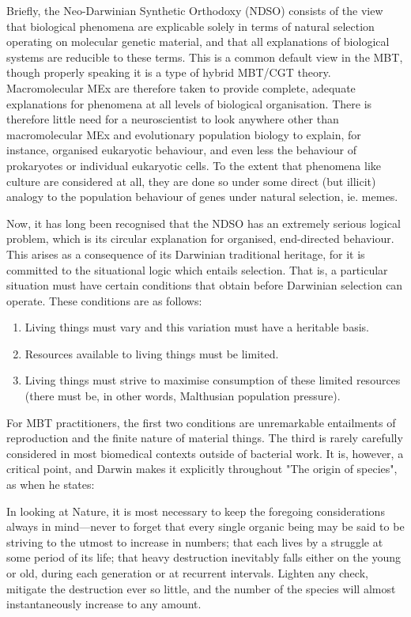 Briefly, the Neo-Darwinian Synthetic Orthodoxy (NDSO) consists of the view that biological phenomena are explicable solely in terms of natural selection operating on molecular genetic material, and that all explanations of biological systems are reducible to these terms. This is a common default view in the MBT, though properly speaking it is a type of hybrid MBT/CGT theory. Macromolecular MEx are therefore taken to provide complete, adequate explanations for phenomena at all levels of biological organisation. There is therefore little need for a neuroscientist to look anywhere other than macromolecular MEx and evolutionary population biology to explain, for instance, organised eukaryotic behaviour, and even less the behaviour of prokaryotes or individual eukaryotic cells. To the extent that phenomena like culture are considered at all, they are done so under some direct (but illicit) analogy to the population behaviour of genes under natural selection, ie. memes.

Now, it has long been recognised that the NDSO has an extremely serious logical problem, which is its circular explanation for organised, end-directed behaviour. This arises as a consequence of its Darwinian traditional heritage, for it is committed to the situational logic which entails selection. That is, a particular situation must have certain conditions that obtain before Darwinian selection can operate. These conditions are as follows:

\begin{enumerate}
\item Living things must vary and this variation must have a heritable basis.
\item Resources available to living things must be limited.
\item Living things must strive to maximise consumption of these limited resources (there must be, in other words, Malthusian population pressure).
\cite{Darwin1888, Swenson1999}
\end{enumerate}

For MBT practitioners, the first two conditions are unremarkable entailments of reproduction and the finite nature of material things. The third is rarely carefully considered in most biomedical contexts outside of bacterial work. It is, however, a critical point, and Darwin makes it explicitly throughout "The origin of species", as when he states:

\begin{longquote}
In looking at Nature, it is most necessary to keep the foregoing
considerations always in mind—never to forget that every single
organic being may be said to be striving to the utmost to increase
in numbers; that each lives by a struggle at some period of its life;
that heavy destruction inevitably falls either on the young or old,
during each generation or at recurrent intervals. Lighten any
check, mitigate the destruction ever so little, and the number of
the species will almost instantaneously increase to any amount.
\cite[p.52]{Darwin1888}
\end{longquote}

